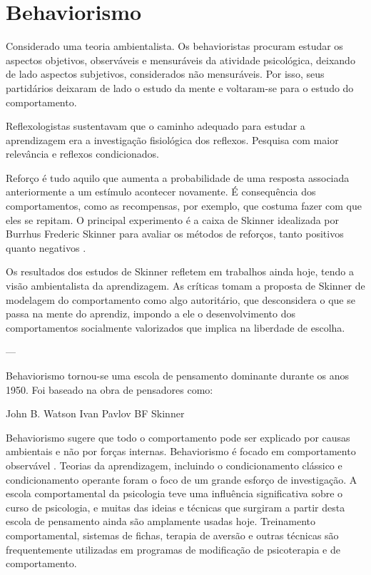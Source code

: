 \section{Behaviorismo}\label{behaviorismo}

Considerado uma teoria ambientalista. 
Os behavioristas procuram estudar os aspectos objetivos, observáveis e mensuráveis da atividade psicológica, deixando de lado aspectos subjetivos, considerados não mensuráveis. 
Por isso, seus partidários deixaram de lado o estudo da mente e voltaram-se para o estudo do comportamento.

Reflexologistas sustentavam que o caminho adequado para estudar a aprendizagem era a investigação fisiológica dos reflexos. Pesquisa com maior relevância e reflexos condicionados.

Reforço é tudo aquilo que aumenta a probabilidade de uma resposta associada anteriormente a um estímulo acontecer novamente. É consequência dos comportamentos, como as recompensas, por exemplo, que costuma fazer com que eles se repitam.
O principal experimento é a caixa de Skinner idealizada por Burrhus Frederic Skinner para avaliar os  métodos de reforços, tanto positivos quanto negativos \cite{silva2007psicologia_educacao}.

Os resultados dos estudos de Skinner refletem em trabalhos ainda hoje, tendo a visão ambientalista da aprendizagem. 
As críticas tomam a proposta de Skinner de modelagem do comportamento como algo autoritário, que desconsidera o que se passa na mente do aprendiz, impondo a ele o desenvolvimento dos comportamentos
socialmente valorizados que implica na liberdade de escolha.

---

Behaviorismo tornou-se uma escola de pensamento dominante durante os anos 1950. 
Foi baseado na obra de pensadores como:

John B. Watson
Ivan Pavlov
BF Skinner

Behaviorismo sugere que todo o comportamento pode ser explicado por causas ambientais e não por forças internas. Behaviorismo é focado em comportamento observável . Teorias da aprendizagem, incluindo o condicionamento clássico e condicionamento operante foram o foco de um grande esforço de investigação.
A escola comportamental da psicologia teve uma influência significativa sobre o curso de psicologia, e muitas das ideias e técnicas que surgiram a partir desta escola de pensamento ainda são amplamente usadas hoje. Treinamento comportamental, sistemas de fichas, terapia de aversão e outras técnicas são frequentemente utilizadas em programas de modificação de psicoterapia e de comportamento.
